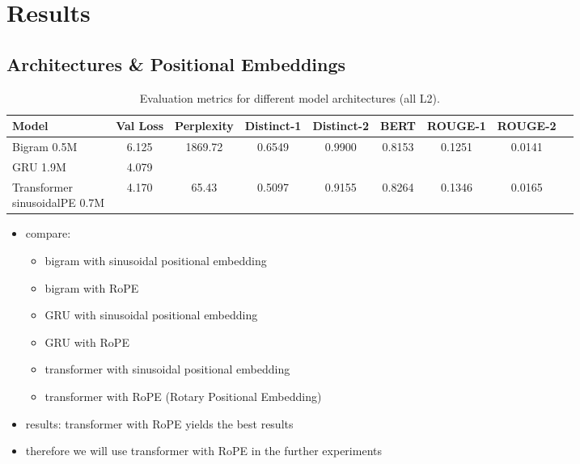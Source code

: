 \section{Results} \label{sec:results}


\subsection*{Architectures \& Positional Embeddings}
\begin{table}[h!]
    \centering
    \begin{tabular}{lcccccccc}
        \hline
        Model                                        & Val Loss & Perplexity & Distinct-1 & Distinct-2 &   BERT & ROUGE-1 & ROUGE-2\\
        \hline
        Bigram 0.5M                                  &    6.125 &   1869.72  &     0.6549 &     0.9900 & 0.8153 &  0.1251 & 0.0141 \\
        GRU 1.9M                                     &    4.079 &            &            &            &        &         &  \\
        \makecell[l]{Transformer\\sinusoidalPE 0.7M} &    4.170 &      65.43 &     0.5097 &     0.9155 & 0.8264 &  0.1346 & 0.0165 \\
        \hline
    \end{tabular}
    \caption{Evaluation metrics for different model architectures (all L2).}
\end{table}
\begin{itemize}
    \item compare:
    \begin{itemize}
        \item bigram with sinusoidal positional embedding
        \item bigram with RoPE
        \item GRU with sinusoidal positional embedding
        \item GRU with RoPE
        \item transformer with sinusoidal positional embedding
        \item transformer with RoPE (Rotary Positional Embedding)
    \end{itemize}
    \item results: transformer with RoPE yields the best results
    \item therefore we will use transformer with RoPE in the further experiments
\end{itemize}



